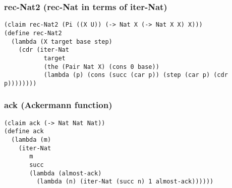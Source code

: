 \subsubsection{rec-Nat2 (rec-Nat in terms of iter-Nat)} \label{code:rec-Nat2}
\begin{verbatim}
(claim rec-Nat2 (Pi ((X U)) (-> Nat X (-> Nat X X) X)))
(define rec-Nat2
  (lambda (X target base step)
    (cdr (iter-Nat
           target
           (the (Pair Nat X) (cons 0 base))
           (lambda (p) (cons (succ (car p)) (step (car p) (cdr p))))))))
\end{verbatim}

\subsubsection{ack (Ackermann function)} \label{code:ack}
\begin{verbatim}
(claim ack (-> Nat Nat Nat))
(define ack
  (lambda (m)
    (iter-Nat
       m
       succ
       (lambda (almost-ack)
         (lambda (n) (iter-Nat (succ n) 1 almost-ack))))))
\end{verbatim}


